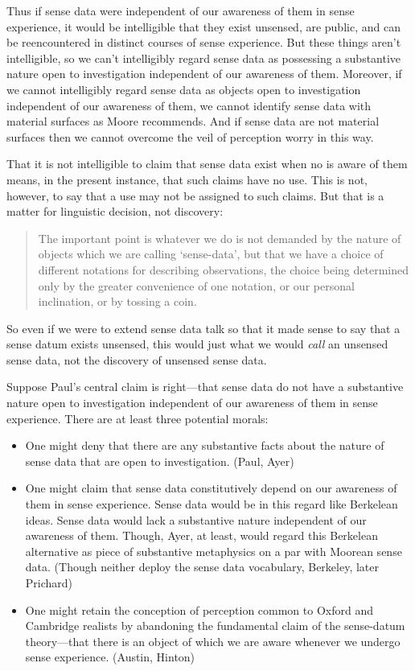 \documentclass[11pt]{article}
\begin{document}
Thus if sense data were independent of our awareness of them in sense experience, it would be intelligible that they exist unsensed, are public, and can be reencountered in distinct courses of sense experience. But these things aren't intelligible, so we can't intelligibly regard sense data as possessing a substantive nature open to investigation independent of our awareness of them. Moreover, if we cannot intelligibly regard sense data as objects open to investigation independent of our awareness of them, we cannot identify sense data with material surfaces as Moore recommends. And if sense data are not material surfaces then we cannot overcome the veil of perception worry in this way.

That it is not intelligible to claim that sense data exist when no is aware of them means, in the present instance, that such claims have no use. This is not, however, to say that a use may not be assigned to such claims. But that is a matter for linguistic decision, not discovery:
\begin{quote}
	The important point is whatever we do is not demanded by the nature of objects which we are calling `sense-data', but that we have a choice of different notations for describing observations, the choice being determined only by the greater convenience of one notation, or our personal inclination, or by tossing a coin.
\end{quote}
So even if we were to extend sense data talk so that it made sense to say that a sense datum exists unsensed, this would just what we would \emph{call} an unsensed sense data, not the discovery of unsensed sense data.

Suppose Paul's central claim is right---that sense data do not have a substantive nature open to investigation independent of our awareness of them in sense experience. There are at least three potential morals:

\begin{itemize}
	\item One might deny that there are any substantive facts about the nature of sense data that are open to investigation. (Paul, Ayer)
	\item One might claim that sense data constitutively depend on our awareness of them in sense experience. Sense data would be in this regard like Berkelean ideas. Sense data would lack a substantive nature independent of our awareness of them. Though, Ayer, at least, would regard this Berkelean alternative as piece of substantive metaphysics on a par with Moorean sense data. (Though neither deploy the sense data vocabulary, Berkeley, later Prichard)
	\item One might retain the conception of perception common to Oxford and Cambridge realists by abandoning the fundamental claim of the sense-datum theory---that there is an object of which we are aware whenever we undergo sense experience. (Austin, Hinton)
\end{itemize}

 

\end{document}
